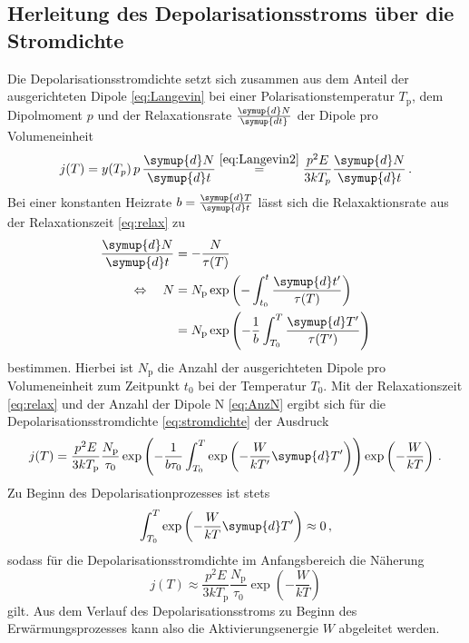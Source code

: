\subsection*{Herleitung des Depolarisationsstroms über die Stromdichte}
Die Depolarisationsstromdichte setzt sich zusammen aus dem Anteil der ausgerichteten Dipole \eqref{eq:Langevin} bei einer Polarisationstemperatur $T_\text{p}$, dem Dipolmoment $p$ und der Relaxationsrate $\frac{\symup{d}N}{\symup{dt}}$ der Dipole pro Volumeneinheit
\begin{equation}\label{eq:stromdichte}
    j(T)=y(T_p)\,p\,\frac{\symup{d}N}{\symup{d}t} \stackrel{\eqref{eq:Langevin2}}{=} \frac{p^2 E}{3kT_p}\frac{\symup{d}N}{\symup{d}t} \, .
\end{equation}
Bei einer konstanten Heizrate $b = \frac{\symup{d}T}{\symup{d}t}$ lässt sich die Relaxaktionsrate aus der Relaxationszeit \eqref{eq:relax} zu
\begin{align}
    \frac{\symup{d}N}{\symup{d}t} & = -\frac{N}{\tau(T)}\notag \\
    \Leftrightarrow \quad N & = N_\text{p}\exp\left(-\int_{t_0}^t \frac{\symup{d}t'}{\tau(T)}\right)\notag \\
    & = N_\text{p}\exp\left(-\frac{1}{b}\int_{T_0}^T \frac{\symup{d}T'}{\tau(T')}\right)\label{eq:AnzN}
\end{align}
bestimmen.
Hierbei ist $N_\text{p}$ die Anzahl der ausgerichteten Dipole pro Volumeneinheit zum Zeitpunkt $t_0$ bei der Temperatur $T_0$.
Mit der Relaxationszeit \eqref{eq:relax} und der Anzahl der Dipole N \eqref{eq:AnzN} ergibt sich für die Depolarisationsstromdichte \eqref{eq:stromdichte} der Ausdruck
\begin{equation}\label{eq:stromdichte2}
    j(T)= \frac{p^2E}{3kT_\text{p}}\frac{N_\text{p}}{\tau_0}\exp\left(-\frac{1}{b\tau_0}\int_{T_0}^T \exp\left(-\frac{W}{kT'}\symup{d}T'\right) \right)\exp\left(-\frac{W}{kT}\right)\, .
\end{equation}
Zu Beginn des Depolarisationprozesses ist stets
\begin{equation}
    \int_{T_0}^T \exp\left(-\frac{W}{kT}\symup{d}T' \right) \approx 0\, ,
\end{equation}
sodass für die Depolarisationsstromdichte im Anfangsbereich die Näherung
\begin{equation}
    j(T)\approx    \frac{p^2 E}{3kT_\text{p}}\frac{N_\text{p}}{\tau_0}\exp\left(-\frac{W}{kT}\right)
\end{equation}
gilt.
Aus dem Verlauf des Depolarisationsstroms zu Beginn des Erwärmungsprozesses kann also die Aktivierungsenergie $W$ abgeleitet werden.

